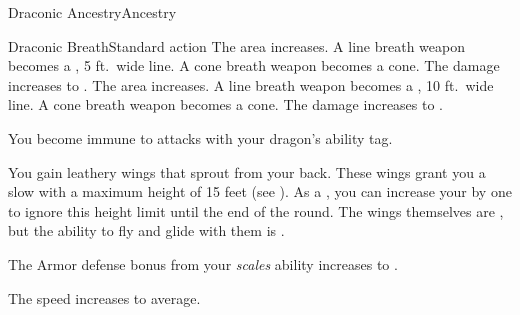 \begin{feat}{Draconic Ancestry}{Ancestry}
\begin{activeability}{Draconic Breath}{Standard action}
      \rankline
       The area increases.
      A line breath weapon becomes a \arealarge, 5 ft.\ wide line.
      A cone breath weapon becomes a \areamed cone.
       The damage increases to \damagerankfive.
       The area increases.
      A line breath weapon becomes a \areahuge, 10 ft.\ wide line.
      A cone breath weapon becomes a \arealarge cone.
       The damage increases to \damagerankseven.
    \end{activeability}

     You become immune to attacks with your dragon's ability tag.

     You gain leathery wings that sprout from your back.
    These wings grant you a slow  with a maximum height of 15 feet (see ).
    As a , you can increase your  by one to ignore this height limit until the end of the round.
    The wings themselves are , but the ability to fly and glide with them is \magical.

     The Armor defense bonus from your \textit{scales} ability increases to .

     The speed increases to average.
  \end{feat}

